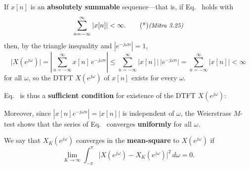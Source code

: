 \documentclass[handout_subfiles_root.tex]{subfiles}
\begin{document}
\begin{factbox}[title={Property}]
If $x[n]$ is an \textbf{absolutely summable} sequence---that is, if Eq.~ holds with
\begin{equation}
\sum_{n=-\infty}^{\infty} |x[n]| < \infty.\MitraTagRef{3.25}
\end{equation}
then, by the triangle inequality and $|e^{-j\omega n}|=1$,
\begin{equation*}
\big|X(e^{j\omega})\big| = \left|\sum_{n=-\infty}^{\infty} x[n]\,e^{-j\omega n}\right|
\le \sum_{n=-\infty}^{\infty} |x[n]|\,\big|e^{-j\omega n}\big|
= \sum_{n=-\infty}^{\infty} |x[n]| < \infty
\end{equation*}
for all $\omega$, so the DTFT $X(e^{j\omega})$ of $x[n]$ exists for every $\omega$.

\medskip
\noindent Eq.~ is thus a \textbf{sufficient condition} for existence of the DTFT $X(e^{j\omega})$:
\begin{center}
\end{center}
\noindent Moreover, since $|x[n]e^{-j\omega n}|=|x[n]|$ is independent of $\omega$, the Weierstrass $M$-test shows that the series of Eq.~ converges \textbf{uniformly} for all $\omega$.
\end{factbox}


\begin{defbox}[title={Def}]
We say that $X_K(e^{j\omega})$ converges in the \textbf{mean-square} to $X(e^{j\omega})$ if
\begin{equation}
\lim_{K\to\infty} \int_{-\pi}^{\pi} \big|X(e^{j\omega}) - X_K(e^{j\omega})\big|^2\,d\omega = 0.
\end{equation}
\end{defbox}
\end{document}

